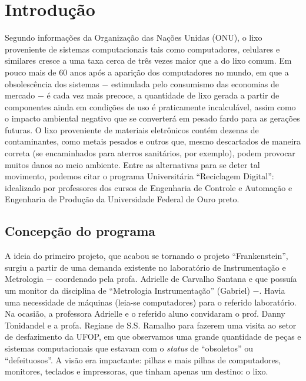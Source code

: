 \documentclass[
	12pt,				%
	openright,			%
	oneside,			%
	a4paper,			%
	english,			%
	spanish,			%
	brazil,				%
	]{abntex2}
\begin{document}
\tableofcontents*
\cleardoublepage


\textual

\chapter{Introdução}
%
Segundo informações da Organização das Nações Unidas (ONU), o lixo proveniente de sistemas computacionais tais como computadores, celulares e similares cresce a uma taxa cerca de três vezes maior que a do lixo comum. Em pouco mais de $60$ anos após a aparição dos computadores no mundo, em que a obsolescência dos sistemas $-$ estimulada pelo consumismo das economias de mercado $-$ é cada vez mais precoce, a quantidade de lixo gerada a partir de componentes ainda em condições de uso é praticamente incalculável, assim como o impacto ambiental negativo que se converterá em pesado fardo para as gerações futuras. O lixo proveniente de materiais eletrônicos contém dezenas de contaminantes, como metais pesados e outros que, mesmo descartados de maneira correta (se encaminhados para aterros sanitários, por exemplo), podem provocar muitos danos ao meio ambiente. Entre as alternativas para se deter tal movimento, podemos citar o programa Universitária ``Reciclagem Digital'': idealizado por professores dos cursos de Engenharia de Controle e Automação e Engenharia de Produção da Universidade Federal de Ouro preto.

\section{Concepção do programa}
A ideia do primeiro projeto, que acabou se tornando o projeto ``Frankenstein'', surgiu a partir de uma demanda existente no laboratório de Instrumentação e Metrologia $-$ coordenado pela profa. Adrielle de Carvalho Santana e que possuía um monitor da disciplina de ``Metrologia Instrumentação'' (Gabriel) $-$. Havia uma necessidade de máquinas (leia-se computadores) para o referido laboratório. Na ocasião, a professora Adrielle e o referido aluno convidaram o prof. Danny Tonidandel e a profa. Regiane de S.S. Ramalho para fazerem uma visita ao setor de desfazimento da UFOP, em que observamos uma grande quantidade de peças e sistemas computacionais que estavam com o \textit{status} de ``obsoletos'' ou ``defeituosos''. A visão era impactante: pilhas e mais pilhas de computadores, monitores, teclados e impressoras, que tinham apenas um destino: o lixo.
\end{document}
